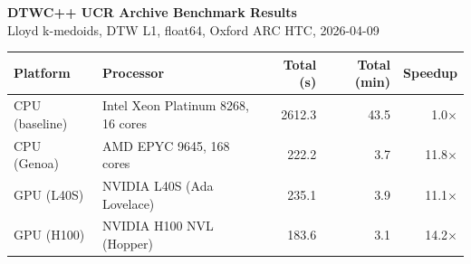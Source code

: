 \documentclass[11pt,landscape]{article}
\begin{document}
\begin{center}
{\Large\bfseries DTWC++ UCR Archive Benchmark Results}\\[4pt]
{\normalsize Lloyd k-medoids, DTW L1, float64, Oxford ARC HTC, 2026-04-09}\\[12pt]
\end{center}

\begin{center}
\begin{tabular}{llrrr}
\toprule
Platform & Processor & Total (s) & Total (min) & Speedup \\
\midrule
CPU (baseline) & Intel Xeon Platinum 8268, 16 cores & 2612.3 & 43.5 & 1.0$\times$ \\
CPU (Genoa) & AMD EPYC 9645, 168 cores & 222.2 & 3.7 & 11.8$\times$ \\
GPU (L40S) & NVIDIA L40S (Ada Lovelace) & 235.1 & 3.9 & 11.1$\times$ \\
GPU (H100) & NVIDIA H100 NVL (Hopper) & 183.6 & 3.1 & 14.2$\times$ \\
\bottomrule
\end{tabular}
\end{center}
\vspace{6pt}
\end{document}
